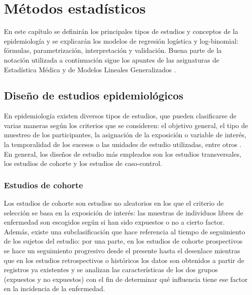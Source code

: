 \chapter{Métodos estadísticos}\label{cap:met}
En este capítulo se definirán los principales tipos de estudios y conceptos de la epidemiología y se explicarán los modelos de regresión logística y log-binomial: fórmulas, parametrización, interpretación y validación. Buena parte de la notación utilizada a continuación sigue los apuntes de las asignaturas de Estadística Médica \autocite{Medica} y de Modelos Lineales Generalizados \autocite{Mlgz}.

\section{Diseño de estudios epidemiológicos}\label{sec:estudios}
En epidemiología existen diversos tipos de estudios, que pueden clasificarse de varias maneras según los criterios que se consideren: el objetivo general, el tipo de muestreo de los participantes,  la asignación de la exposición o variable de interés, la temporalidad de los sucesos o las unidades de estudio utilizadas, entre otros \autocite{Hernandez}. En general, los diseños de estudio más empleados son los estudios transversales, los estudios de cohorte y los estudios de caso-control. \\

\subsection{Estudios de cohorte}
Los estudios de cohorte son estudios no aleatorios en los que el criterio de selección se basa en la exposición de interés: las muestras de individuos libres de enfermedad son escogidos según si han sido expuestos o no a cierto factor.\\

Además, existe una subclasificación que hace referencia al tiempo de seguimiento de los sujetos del estudio: por una parte, en los estudios de cohorte prospectivos se hace un seguimiento progresivo desde el presente hasta el desenlace mientras que en los estudios retrospectivos o históricos los datos son obtenidos a partir de registros ya existentes y se analizan las características de los dos grupos (expuestos y no expuestos) con el fin de determinar qué influencia tiene ese factor en la incidencia de la enfermedad. \\

